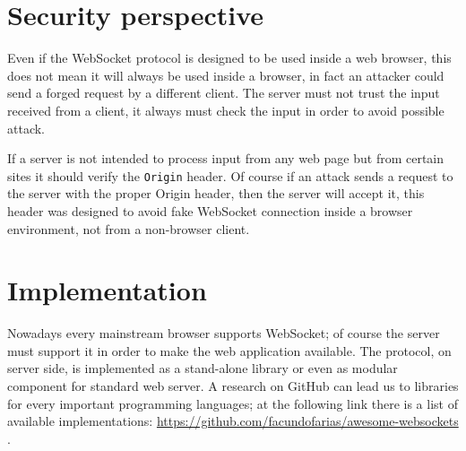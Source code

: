\section{Security perspective}
Even if the WebSocket protocol is designed to be used inside a web browser, this does not mean it will always be used inside a browser, in fact an attacker could send a forged request by a different client.\newline
The server must not trust the input received from a client, it always must check the input in order to avoid possible attack.\newline

If a server is not intended to process input from any web page but from certain sites it should verify the \texttt{Origin} header.\newline
Of course if an attack sends a request to the server with the proper Origin header, then the server will accept it, this header was designed to
avoid fake WebSocket connection inside a browser environment, not from a non-browser client.\newline

\section{Implementation} 
Nowadays every mainstream browser supports WebSocket; of course the server must support it in order to make the web application available.\newline
The protocol, on server side, is implemented as a stand-alone library or even as modular component for standard web server.\newline
A research on GitHub can lead us to libraries for every important programming languages; at the following link there is a list of 
available implementations: \url{https://github.com/facundofarias/awesome-websockets} .

